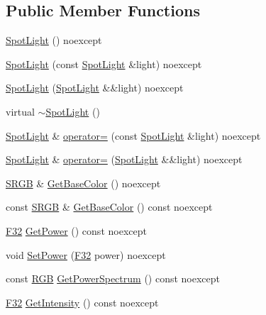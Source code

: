 \subsection*{Public Member Functions}
\begin{DoxyCompactItemize}
\item 
\hyperlink{classmage_1_1_spot_light_ae82577a45cf84c375a58b1789a05ce0d}{Spot\+Light} () noexcept
\item 
\hyperlink{classmage_1_1_spot_light_a93287b22630e43766fdab04e0c235a30}{Spot\+Light} (const \hyperlink{classmage_1_1_spot_light}{Spot\+Light} \&light) noexcept
\item 
\hyperlink{classmage_1_1_spot_light_a694e2e49340440515438a86baa284431}{Spot\+Light} (\hyperlink{classmage_1_1_spot_light}{Spot\+Light} \&\&light) noexcept
\item 
virtual \hyperlink{classmage_1_1_spot_light_aeeaba91c6448102ac6a23587c5366808}{$\sim$\+Spot\+Light} ()
\item 
\hyperlink{classmage_1_1_spot_light}{Spot\+Light} \& \hyperlink{classmage_1_1_spot_light_a5923f3d1ec5061965af8094e1e1d3855}{operator=} (const \hyperlink{classmage_1_1_spot_light}{Spot\+Light} \&light) noexcept
\item 
\hyperlink{classmage_1_1_spot_light}{Spot\+Light} \& \hyperlink{classmage_1_1_spot_light_a4a618538ddc977e4c81be098b35ed2ac}{operator=} (\hyperlink{classmage_1_1_spot_light}{Spot\+Light} \&\&light) noexcept
\item 
\hyperlink{structmage_1_1_s_r_g_b}{S\+R\+GB} \& \hyperlink{classmage_1_1_spot_light_ad1345ae07a114dc8d4b6a00d08b4230a}{Get\+Base\+Color} () noexcept
\item 
const \hyperlink{structmage_1_1_s_r_g_b}{S\+R\+GB} \& \hyperlink{classmage_1_1_spot_light_afe96354e78abccea8fd5a4745728f5f3}{Get\+Base\+Color} () const noexcept
\item 
\hyperlink{namespacemage_aa97e833b45f06d60a0a9c4fc22ae02c0}{F32} \hyperlink{classmage_1_1_spot_light_afcfb600550f5ca9292e79e5bedb9fad7}{Get\+Power} () const noexcept
\item 
void \hyperlink{classmage_1_1_spot_light_aa2f5ad93e148d2d4fcf1512869c1ffa2}{Set\+Power} (\hyperlink{namespacemage_aa97e833b45f06d60a0a9c4fc22ae02c0}{F32} power) noexcept
\item 
const \hyperlink{structmage_1_1_r_g_b}{R\+GB} \hyperlink{classmage_1_1_spot_light_a2c9926f4332198ef4183f7958e9a5644}{Get\+Power\+Spectrum} () const noexcept
\item 
\hyperlink{namespacemage_aa97e833b45f06d60a0a9c4fc22ae02c0}{F32} \hyperlink{classmage_1_1_spot_light_a3df0792c637a6167c7c596ce125abbe0}{Get\+Intensity} () const noexcept

\end{DoxyCompactItemize}
